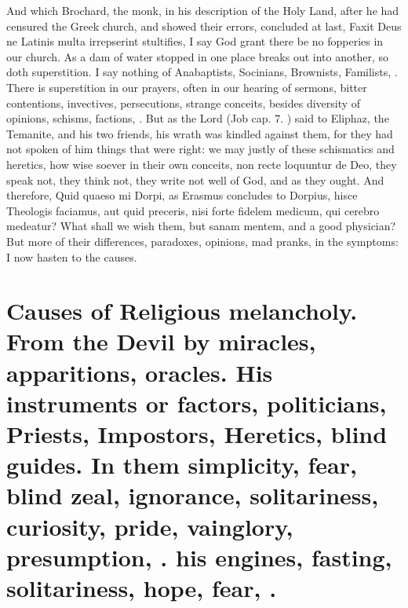 {And which Brochard, the monk, in his description of the Holy
Land, after he had censured the Greek church, and showed their errors,
concluded at last, Faxit Deus ne Latinis multa irrepserint stultifies,
I say God grant there be no fopperies in our church. As a dam of water
stopped in one place breaks out into another, so doth superstition. I
say nothing of Anabaptists, Socinians, Brownists, Familists, \etc{}. There
is superstition in our prayers, often in our hearing of sermons, bitter
contentions, invectives, persecutions, strange conceits, besides
diversity of opinions, schisms, factions, \etc{}. But as the Lord (Job
 cap. 7. ) said to Eliphaz, the Temanite, and his two friends,
his wrath was kindled against them, for they had not spoken of him
things that were right: we may justly of these schismatics and
heretics, how wise soever in their own conceits, non recte loquuntur de
Deo, they speak not, they think not, they write not well of God, and as
they ought. And therefore, Quid quaeso mi Dorpi, as Erasmus concludes
to Dorpius, hisce Theologis faciamus, aut quid preceris, nisi forte
fidelem medicum, qui cerebro medeatur? What shall we wish them, but
sanam mentem, and a good physician? But more of their differences,
paradoxes, opinions, mad pranks, in the symptoms: I now hasten to the
causes.

\section[Causes of Religious melancholy]{Causes of Religious melancholy. From the Devil by miracles, apparitions, oracles. His instruments or factors, politicians, Priests, Impostors, Heretics, blind guides. In them simplicity, fear, blind zeal, ignorance, solitariness, curiosity, pride, vainglory, presumption, \etc{}. his engines, fasting, solitariness, hope, fear, \etc{}.}

}

